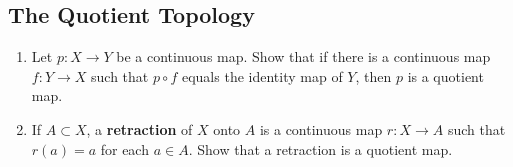 \subsection{The Quotient Topology}

\begin{exercise}[ID=2.22.2]
  \begin{enumerate}[label={(\alph*)}, align=left, leftmargin=\parindent, listparindent=\parindent, labelwidth=0pt, itemindent=!]
    \item
      Let $p: X \rightarrow Y$ be a continuous map.
      Show that if there is a continuous map $f: Y \rightarrow X$ such that $p \circ f$ equals the identity map of $Y$, then $p$ is a quotient map.
    \item
      If $A \subset X$, a \textbf{retraction} of $X$ onto $A$ is a continuous map $r: X \rightarrow A$ such that $r(a) = a$ for each $a \in A$.
      Show that a retraction is a quotient map.
  \end{enumerate}
\end{exercise}
%
